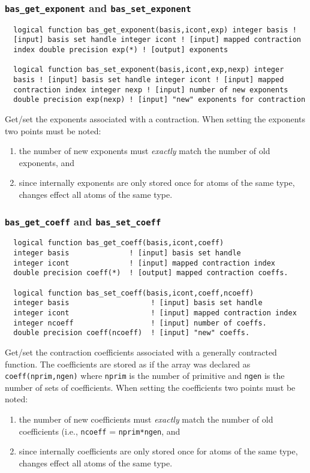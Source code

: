 \subsubsection{{\tt bas\_get\_exponent} and {\tt bas\_set\_exponent}}
\begin{verbatim}
  logical function bas_get_exponent(basis,icont,exp) integer basis !
  [input] basis set handle integer icont ! [input] mapped contraction
  index double precision exp(*) ! [output] exponents

  logical function bas_set_exponent(basis,icont,exp,nexp) integer
  basis ! [input] basis set handle integer icont ! [input] mapped
  contraction index integer nexp ! [input] number of new exponents
  double precision exp(nexp) ! [input] "new" exponents for contraction
\end{verbatim}
Get/set the exponents associated with a contraction.  When setting the
exponents two points must be noted:
\begin{enumerate}
\item the number of new exponents must {\em exactly} match the number
  of old exponents, and
\item since internally exponents are only stored once for atoms of the
  same type, changes effect all atoms of the same type.
\end{enumerate}

\subsubsection{{\tt bas\_get\_coeff} and {\tt bas\_set\_coeff}}
\begin{verbatim}
  logical function bas_get_coeff(basis,icont,coeff)
  integer basis              ! [input] basis set handle
  integer icont              ! [input] mapped contraction index
  double precision coeff(*)  ! [output] mapped contraction coeffs.

  logical function bas_set_coeff(basis,icont,coeff,ncoeff)
  integer basis                   ! [input] basis set handle                   
  integer icont                   ! [input] mapped contraction index           
  integer ncoeff                  ! [input] number of coeffs.
  double precision coeff(ncoeff)  ! [input] "new" coeffs. 
\end{verbatim}
Get/set the contraction coefficients associated with a generally
contracted function.  The coefficients are stored as if the array was
declared as {\tt coeff(nprim,ngen)} where {\tt nprim} is the number of
primitive and {\tt ngen} is the number of sets of coefficients.  When
setting the coefficients two points must be noted:
\begin{enumerate}
\item the number of new coefficients must {\em exactly} match the
  number of old coefficients (i.e., {\tt ncoeff} = {\tt nprim*ngen}, and
\item since internally coefficients are only stored once for atoms of the
  same type, changes effect all atoms of the same type.
\end{enumerate}

